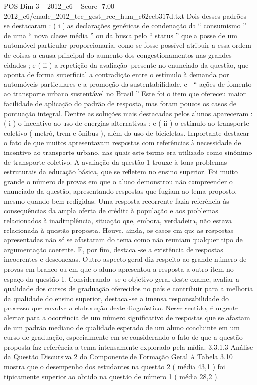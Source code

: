 \begin{textsample}{POS Dim 3 – 2012\_c6 – Score -7.00 – 2012\_c6/enade\_2012\_tec\_gest\_rec\_hum\_c62ecb317d.txt}
Dois desses padrões se destacaram : ( i ) as declarações genéricas de condenação do “ consumismo ” de uma “ nova classe média ” ou da busca pelo “ status ” que a posse de um automóvel particular proporcionaria, como se fosse possível atribuir a essa ordem de coisas a causa principal do aumento dos congestionamentos nas grandes cidades ; e ( ii ) a repetição da avaliação, presente no enunciado da questão, que aponta de forma superficial a contradição entre o estímulo à demanda por automóveis particulares e a promoção da sustentabilidade. c - “ ações de fomento ao transporte urbano sustentável no Brasil ” Este foi o item que ofereceu maior facilidade de aplicação do padrão de resposta, mas foram poucos os casos de pontuação integral.
Dentre as soluções mais destacadas pelos alunos apareceram : ( i ) o incentivo ao uso de energias alternativas ; e ( ii ) o estímulo ao transporte coletivo ( metrô, trem e ônibus ), além do uso de bicicletas.
Importante destacar o fato de que muitos apresentavam respostas com referências à necessidade de incentivo ao transporte urbano, nas quais este termo era utilizado como sinônimo de transporte coletivo.
A avaliação da questão 1 trouxe à tona problemas estruturais da educação básica, que se refletem no ensino superior.
Foi muito grande o número de provas em que o aluno demonstrou não compreender o enunciado da questão, apresentando respostas que fugiam ao tema proposto, mesmo quando bem redigidas.
Uma resposta recorrente fazia referência às consequências da ampla oferta de crédito à população e aos problemas relacionados à inadimplência, situação que, embora, verdadeira, não estava relacionada à questão proposta.
Houve, ainda, os casos em que as respostas apresentadas não só se afastaram do tema como não reuniam qualquer tipo de argumentação coerente.
E, por fim, destaca -se a existência de respostas incoerentes e desconexas.
Outro aspecto geral diz respeito ao grande número de provas em branco ou em que o aluno apresentou a resposta a outro item no espaço da questão 1.
Considerando -se o objetivo geral deste exame, avaliar a qualidade dos cursos de graduação oferecidos no país e contribuir para a melhoria da qualidade do ensino superior, destaca -se a imensa responsabilidade do processo que envolve a elaboração deste diagnóstico.
Nesse sentido, é urgente alertar para a ocorrência de um número significativo de respostas que se afastam de um padrão mediano de qualidade esperado de um aluno concluinte em um curso de graduação, especialmente em se considerando o fato de que a questão proposta faz referência a tema intensamente explorado pela mídia. 3.3.1.3 Análise da Questão Discursiva 2 do Componente de Formação Geral A Tabela 3.10 mostra que o desempenho dos estudantes na questão 2 ( média 43,1 ) foi tipicamente superior ao obtido na questão de número 1 ( média 28,2 ).

\end{textsample}
